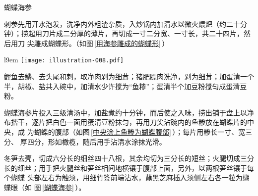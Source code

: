 \begin{recipe}{蝴蝶海参}

\ingredients


\preparation

\step 刺参先用开水泡发，洗净内外粗渣杂质，入炒锅内加清水以微火煨𤆵（约二十分
钟）；捞起用刀片成二分厚的薄片，再切成一寸二分宽、一寸长，共二十四片，然后用刀
尖雕成蝴蝶形。（如图\,\ref{用海参雕成的蝴蝶形}\,）

\begin{wrapfigure}[7]{l}{9em}%
\centering%
\vspace{-.6875\baselineskip}%
\texttt{[image: illustration-008.pdf]}%
\vspace{-.1875\baselineskip}%
\caption{用海参雕成的蝴蝶形}%
\label{用海参雕成的蝴蝶形}%
\end{wrapfigure}

\step 鲤鱼去鱗、去头尾和刺，取净肉剁为细茸；猪肥膘肉洗净，剁为细茸；加蛋清一个
半，胡椒、盐共入碗中，加清水少许搅为“鱼糁”；蛋清半个加豆粉搅匀成蛋清豆粉。

\step 蝴蝶海参片投入三级清汤中，加盐煮约十分钟，而后使之入味，捞出铺于盘上以净
布揩干，逐片把白色一面用蛋清豆粉抹匀，再用刀尖沾碗内的鱼糁放在蝴蝶片的中央，成
为蝴蝶的腹部（如图\,\ref{中央涂上鱼糁为蝴蝶腹部}\,）；每片用糁长一寸、宽三分、
厚四分，形如橄榄，随后用手沾清水涂抹光滑。

\step 冬笋去壳，切成六分长的细丝四十八根，其余均切为三分长的短丝；火腿切成三分
长的细丝；用手把火腿丝和笋丝相间地横镶于腹部上面，另外，以两根笋丝镶于每个蝴蝶
头部左右为触须，用细竹签前端沾水，蘸黑芝麻插入须侧左右各一粒为蝴蝶眼（如
图\,\ref{蝴蝶海参}\,）。


\end{recipe}
